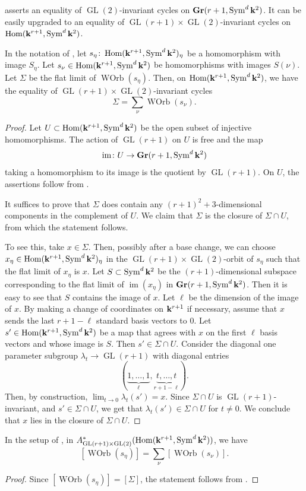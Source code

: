 \documentclass[11pt]{amsart}
\providecommand {\Gr}{{\bf Gr}}
\providecommand{\GL}{\operatorname{GL}}
\providecommand{\Hom}{\operatorname{Hom}}
\providecommand{\Sym}{\operatorname{Sym}}
\providecommand{\im}{\operatorname{im}}
\DeclareMathOperator{\WOrb}{WOrb}
\begin{document}
 asserts an equality of \(\GL(2)\)-invariant cycles on \(\Gr(r+1, \Sym^d\k^2)\).
It can be easily upgraded to an equality of \(\GL(r+1) \times \GL(2)\)-invariant cycles on \(\Hom(\k^{r+1}, \Sym^d \k^2)\).
\begin{proposition}\label{prop:degeneration2}
  In the notation of , let \(s_\eta \colon \Hom(\k^{r+1}, \Sym^d \k^2)_\eta\) be a homomorphism with image \(S_\eta\).
  Let \(s_\nu \in \Hom(\k^{r+1}, \Sym^d\k^2)\) be homomorphisms with images \(S(\nu)\).
  Let \(\Sigma\) be the flat limit of \(\WOrb(s_\eta)\).
  Then, on \(\Hom(\k^{r+1}, \Sym^d\k^2)\), we have the equality of \(\GL(r+1) \times \GL(2)\)-invariant cycles
  \[ \Sigma = \sum_\nu \WOrb(s_\nu).\]
\end{proposition}
\begin{proof}
  Let \(U \subset \Hom(\k^{r+1}, \Sym^d\k^2)\) be the open subset of injective homomorphisms.
  The action of \(\GL(r+1)\) on \(U\) is free and the map
  \[\im \colon U \to \Gr(r+1, \Sym^d\k^2)\]
  taking a homomorphism to its image is the quotient by \(\GL(r+1)\).
  On \(U\), the assertions follow from .

  It suffices to prove that \(\Sigma\) does contain any \((r+1)^2+3\)-dimensional components in the complement of \(U\).
  We claim that \(\Sigma\) is the closure of \(\Sigma \cap U\), from which the statement follows.

  To see this, take \(x \in \Sigma\).
  Then, possibly after a base change, we can choose \(x_\eta \in \Hom(\k^{r+1}, \Sym^d\k^2)_\eta\) in the \(\GL(r+1) \times \GL(2)\)-orbit of \(s_\eta\) such that the flat limit of \(x_\eta\) is \(x\).
  Let \(S \subset \Sym^d\k^2\) be the \((r+1)\)-dimensional subspace corresponding to the flat limit of \(\im(x_\eta)\) in \(\Gr(r+1, \Sym^d\k^2)\).
  Then it is easy to see that \(S\) contains the image of \(x\).
  Let \(\ell\) be the dimension of the image of \(x\).
  By making a change of coordinates on \(\mathbf k^{r+1}\) if necessary, assume that \(x\) sends the last \(r+1-\ell\) standard basis vectors to 0.
  Let \(s' \in \Hom(\k^{r+1}, \Sym^d\k^2)\) be a map that agrees with \(x\) on the first \(\ell\) basis vectors and whose image is \(S\).
  Then \(s' \in \Sigma \cap U\).
  Consider the diagonal one parameter subgroup \(\lambda_t \to \GL(r+1)\) with diagonal entries
  \[ (\underbrace{1, \dots, 1}_{\ell}, \underbrace{t, \dots, t}_{r+1-\ell}).\]
  Then, by construction, \(\lim_{t \to 0} \lambda_t(s') = x\).
  Since \(\Sigma \cap U\) is \(\GL(r+1)\)-invariant, and \(s' \in \Sigma \cap U\), we get that \(\lambda_t(s') \in \Sigma \cap U\) for \(t \neq 0\).
  We conclude that \(x\) lies in the closure of \(\Sigma \cap U\).  
\end{proof}
\begin{corollary}\label{thm:spec}
  In the setup of , in \(A^*_{\GL(r+1) \times \GL(2)}(\Hom(\k^{r+1},\Sym^d\k^2))\), we have
  \[ [\WOrb(s_\eta)] = \sum_\nu [\WOrb(s_\nu)].\]
\end{corollary}
\begin{proof}
  Since \([\WOrb(s_\eta)] = [\Sigma]\), the statement follows from .
\end{proof}
\end{document}
